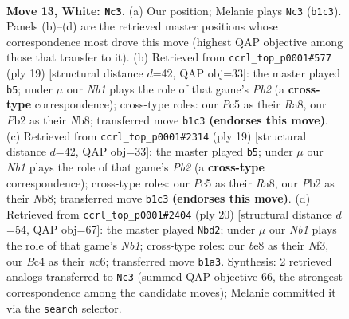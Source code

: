 \documentclass[11pt]{article}
\begin{document}
\clearpage

\begin{figure}[p]\centering
\begin{subfigure}{0.46\textwidth}\centering
\resizebox{\linewidth}{!}{%
\newchessgame
\chessboard[
  setfen={rn2bbr1/1p2kppp/p3pn2/2P5/P1B5/3NPP2/1P4PP/RNB2RK1 w - - 1 13},
  showmover=false,
  pgfstyle=straightmove, color=movearrow, markmove={b1-c3}
]}
\caption{}
\end{subfigure}\hfill
\begin{subfigure}{0.46\textwidth}\centering
\resizebox{\linewidth}{!}{%
\newchessgame
\chessboard[
  setfen={rnb4r/1p2kppp/p3pn2/2b5/8/2N1PN2/PP2BPPP/R1B2RK1 b - - 3 10},
  showmover=false,
  pgfstyle=straightmove, color=movearrow, markmove={b7-b5}
]}
\caption{}
\end{subfigure}
\\[4pt]
\begin{subfigure}{0.46\textwidth}\centering
\resizebox{\linewidth}{!}{%
\newchessgame
\chessboard[
  setfen={rnb4r/1p2kppp/p3pn2/2b5/8/2N1PN2/PP2BPPP/R1B2RK1 b - - 3 10},
  showmover=false,
  pgfstyle=straightmove, color=movearrow, markmove={b7-b5}
]}
\caption{}
\end{subfigure}\hfill
\begin{subfigure}{0.46\textwidth}\centering
\resizebox{\linewidth}{!}{%
\newchessgame
\chessboard[
  setfen={r1b1k2r/1p2bppp/p1n1pn2/8/1PB5/P3PN2/5PPP/RNBR2K1 w kq - 1 11},
  showmover=false,
  pgfstyle=straightmove, color=movearrow, markmove={b1-d2}
]}
\caption{}
\end{subfigure}
\caption{\textbf{Move 13, White: \texttt{Nc3}.} (a) Our position; Melanie plays \texttt{Nc3} (\texttt{b1c3}). Panels (b)--(d) are the retrieved master positions whose correspondence most drove this move (highest QAP objective among those that transfer to it). (b) Retrieved from \texttt{ccrl\_top\_p0001\#577} (ply 19) [structural distance $d$=42, QAP obj=33]: the master played \texttt{b5}; under $\mu$ our \emph{Nb1} plays the role of that game's \emph{Pb2} (a \textbf{cross-type} correspondence); cross-type roles: our \emph{P}c5 as their \emph{R}a8, our \emph{P}b2 as their \emph{N}b8; transferred move \texttt{b1c3} \textbf{(endorses this move)}. (c) Retrieved from \texttt{ccrl\_top\_p0001\#2314} (ply 19) [structural distance $d$=42, QAP obj=33]: the master played \texttt{b5}; under $\mu$ our \emph{Nb1} plays the role of that game's \emph{Pb2} (a \textbf{cross-type} correspondence); cross-type roles: our \emph{P}c5 as their \emph{R}a8, our \emph{P}b2 as their \emph{N}b8; transferred move \texttt{b1c3} \textbf{(endorses this move)}. (d) Retrieved from \texttt{ccrl\_top\_p0001\#2404} (ply 20) [structural distance $d$=54, QAP obj=67]: the master played \texttt{Nbd2}; under $\mu$ our \emph{Nb1} plays the role of that game's \emph{Nb1}; cross-type roles: our \emph{b}e8 as their \emph{N}f3, our \emph{B}c4 as their \emph{n}c6; transferred move \texttt{b1a3}. Synthesis: 2 retrieved analogs transferred to \texttt{Nc3} (summed QAP objective 66, the strongest correspondence among the candidate moves); Melanie committed it via the \texttt{search} selector.}
\label{fig:thought-m24}
\end{figure}
\end{document}
